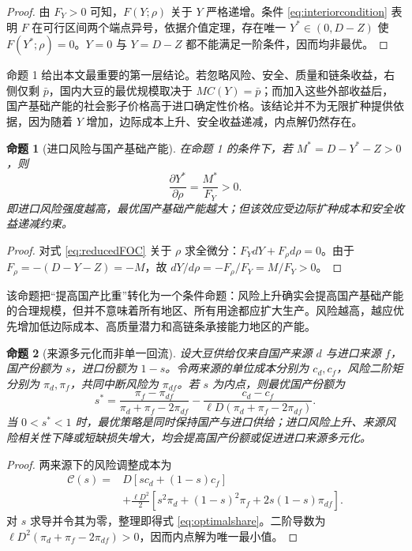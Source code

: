 \documentclass[UTF8,zihao=-4,fontset=fandol]{ctexart}
\numberwithin{equation}{section}
\newtheorem{proposition}{命题}
\theoremstyle{definition}
\theoremstyle{remark}
\begin{document}
\begin{proof}
由 $F_Y>0$ 可知，$F(Y;\rho)$ 关于 $Y$ 严格递增。条件 \eqref{eq:interiorcondition} 表明 $F$ 在可行区间两个端点异号，依据介值定理，存在唯一 $Y^*\in(0,D-Z)$ 使 $F(Y^*;\rho)=0$。$Y=0$ 与 $Y=D-Z$ 都不能满足一阶条件，因而均非最优。\end{proof}

命题 1 给出本文最重要的第一层结论。若忽略风险、安全、质量和链条收益，右侧仅剩 $\bar p$，国内大豆的最优规模取决于 $MC(Y)=\bar p$；而加入这些外部收益后，国产基础产能的社会影子价格高于进口确定性价格。该结论并不为无限扩种提供依据，因为随着 $Y$ 增加，边际成本上升、安全收益递减，内点解仍然存在。

\begin{proposition}[进口风险与国产基础产能]
在命题 1 的条件下，若 $M^*=D-Y^*-Z>0$，则
\begin{equation}
 \frac{\partial Y^*}{\partial\rho}=\frac{M^*}{F_Y}>0.
 \label{eq:rhoeffect}
\end{equation}
即进口风险强度越高，最优国产基础产能越大；但该效应受边际扩种成本和安全收益递减约束。
\end{proposition}

\begin{proof}
对式 \eqref{eq:reducedFOC} 关于 $\rho$ 求全微分：$F_YdY+F_\rho d\rho=0$。由于 $F_\rho=-(D-Y-Z)=-M$，故 $dY/d\rho=-F_\rho/F_Y=M/F_Y>0$。\end{proof}

该命题把“提高国产比重”转化为一个条件命题：风险上升确实会提高国产基础产能的合理规模，但并不意味着所有地区、所有用途都应扩大生产。风险越高，越应优先增加低边际成本、高质量潜力和高链条承接能力地区的产能。

\begin{proposition}[来源多元化而非单一回流]
设大豆供给仅来自国产来源 $d$ 与进口来源 $f$，国产份额为 $s$，进口份额为 $1-s$。令两来源的单位成本分别为 $c_d,c_f$，风险二阶矩分别为 $\pi_d,\pi_f$，共同中断风险为 $\pi_{df}$。若 $s$ 为内点，则最优国产份额为
\begin{equation}
 s^*=\frac{\pi_f-\pi_{df}}{\pi_d+\pi_f-2\pi_{df}}
 -\frac{c_d-c_f}{\ell D\left(\pi_d+\pi_f-2\pi_{df}\right)}.
 \label{eq:optimalshare}
\end{equation}
当 $0<s^*<1$ 时，最优策略是同时保持国产与进口供给；进口风险上升、来源风险相关性下降或短缺损失增大，均会提高国产份额或促进进口来源多元化。
\end{proposition}

\begin{proof}
两来源下的风险调整成本为
\begin{align}
 \mathcal{C}(s)=&D\left[sc_d+(1-s)c_f\right]\\
 &+\frac{\ell D^2}{2}\left[s^2\pi_d+(1-s)^2\pi_f+2s(1-s)\pi_{df}\right].
 \label{eq:twosourcecost}
\end{align}
对 $s$ 求导并令其为零，整理即得式 \eqref{eq:optimalshare}。二阶导数为 $\ell D^2(\pi_d+\pi_f-2\pi_{df})>0$，因而内点解为唯一最小值。\end{proof}
\end{document}
